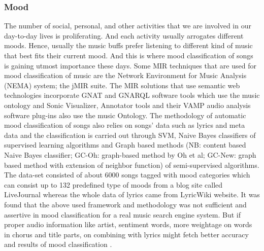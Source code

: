 \documentclass{proc}
\begin{document}
\subsubsection{Mood}
The number of social, personal, and other activities that we are involved in our day-to-day lives is proliferating. And each activity usually arrogates different moods. Hence, usually the music buffs prefer listening to different kind of music that best fits their current mood. And this is where mood classification of songs is gaining utmost importance these days. Some MIR techniques that are used for mood classification of music are the Network Environment for Music Analysis (NEMA) system; the jMIR suite. The MIR solutions that use semantic web technologies incorporate GNAT and GNARQL software tools which use the music ontology and Sonic Visualizer, Annotator tools and their VAMP audio analysis software plug-ins also use the music Ontology.  The methodology of automatic mood classification of songs  also relies on  songs’ data such as lyrics and meta data and the classification is carried out through SVM, Naive Bayes classifiers of supervised learning algorithms and Graph based methods (NB: content based Naive Bayes classifier; GC-Oh: graph-based method by Oh et al; GC-New: graph based method with extension of neighbor function) of semi-supervised algorithms. The data-set consisted of about 6000 songs tagged with mood categories which can consist up to 132 predefined type of moods from a blog site called LiveJournal whereas the whole data of lyrics came from LyricWiki website. It was found that the above used framework and methodology was not sufficient and assertive in mood classification for a real music search engine system. But if proper audio information like artist, sentiment words, more weightage on words in chorus and title parts, on combining with lyrics might fetch better accuracy and results of mood classification \cite{Dang2009}. 
\end{document}

